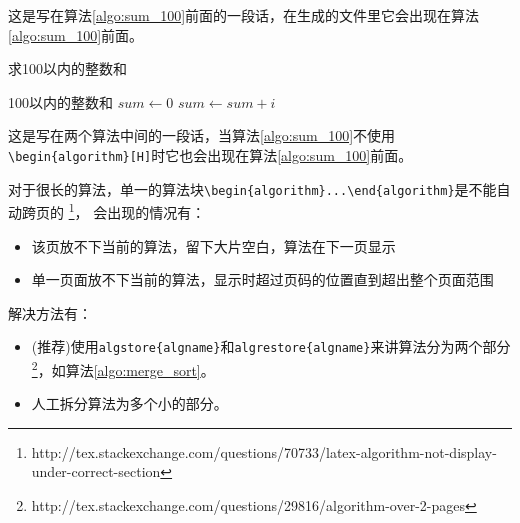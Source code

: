 这是写在算法\ref{algo:sum_100}前面的一段话，在生成的文件里它会出现在算法\ref{algo:sum_100}前面。

\begin{algorithm}
\caption{求100以内的整数和}
\label{algo:sum_100}
\begin{algorithmic}[1] %
\Ensure 100以内的整数和 %
\State $sum \gets 0$
    \State $sum \gets sum + i$
  \EndFor
\end{algorithmic}
\end{algorithm}

这是写在两个算法中间的一段话，当算法\ref{algo:sum_100}不使用\verb+\begin{algorithm}[H]+时它也会出现在算法\ref{algo:sum_100}前面。

对于很长的算法，单一的算法块\verb+\begin{algorithm}...\end{algorithm}+是不能自动跨页的
\footnote{http://tex.stackexchange.com/questions/70733/latex-algorithm-not-display-under-correct-section}，
会出现的情况有：

\begin{itemize}
  \item 该页放不下当前的算法，留下大片空白，算法在下一页显示
  \item 单一页面放不下当前的算法，显示时超过页码的位置直到超出整个页面范围
\end{itemize}

解决方法有：

\begin{itemize}
  \item (推荐)使用\verb+algstore{algname}+和\verb+algrestore{algname}+来讲算法分为两个部分\footnote{http://tex.stackexchange.com/questions/29816/algorithm-over-2-pages}，如算法\ref{algo:merge_sort}。
  \item 人工拆分算法为多个小的部分。
\end{itemize}

